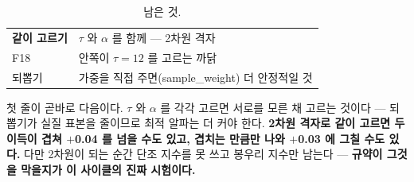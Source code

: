 \documentclass[10pt]{article}
\begin{document}

\begin{table}[t]
\centering\tsize
\caption{남은 것.}
\begin{tabular}{ll}
\toprule
\textbf{같이 고르기} & $\tau$ 와 $\alpha$ 를 함께 --- 2차원 격자 \\
F18 & 안쪽이 $\tau{=}12$ 를 고르는 까닭 \\
되뽑기 & 가중을 직접 주면(sample\_weight) 더 안정적일 것 \\
\bottomrule
\end{tabular}
\end{table}

첫 줄이 곧바로 다음이다. $\tau$ 와 $\alpha$ 를 각각 고르면 서로를 모른 채
고르는 것이다 --- 되뽑기가 실질 표본을 줄이므로 최적 알파는 더 커야 한다.
\textbf{2차원 격자로 같이 고르면 두 이득이 겹쳐 $+$0.04 를 넘을 수도 있고,
겹치는 만큼만 나와 $+$0.03 에 그칠 수도 있다.} 다만 2차원이 되는 순간
단조 지수를 못 쓰고 봉우리 지수만 남는다 --- \textbf{규약이 그것을 막을지가
이 사이클의 진짜 시험이다.}
\end{document}
